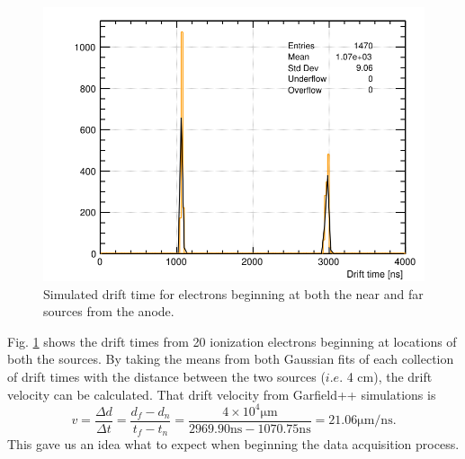 \begin{figure}[h!]
	\centering
	\includegraphics[width=0.8\linewidth]{figures/vdc_sim_td.png}
	\caption{Simulated drift time for electrons beginning at both the near and far sources from the anode.}
	\label{fig:vdc_sim_td}
\end{figure}

Fig. \ref{fig:vdc_sim_td} shows the drift times from 20 ionization electrons beginning at locations of both the sources.  By taking the means from both Gaussian fits of each collection of drift times with the distance between the two sources ($i.e.$ 4 cm), the drift velocity can be calculated. That drift velocity from Garfield++ simulations is
\begin{equation}
v = \frac{\Delta d}{\Delta t} = \frac{d_f - d_n}{t_f - t_n} = \frac{4 \times 10^{4} \mathrm{\mu m}} {2969.90 \mathrm{ ns} - 1070.75 \mathrm{ ns}} = 21.06  \mathrm{ \mu m/ns}.
\end{equation}
This gave us an idea what to expect when beginning the data acquisition process. 